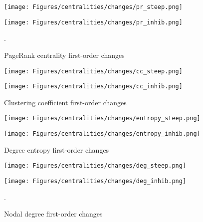 \documentclass[smallextended]{svjour3}       %
\theoremstyle{definition}
\begin{document}
\begin{figure}[]
	\centering
	\hfill
	\begin{minipage}{0.50\textwidth}%
		\texttt{[image: Figures/centralities/changes/pr\_steep.png]}
		\hspace*{2cm}\subcaption{}
	\end{minipage}
	\hfill
	\begin{minipage}{0.40\textwidth}
		\texttt{[image: Figures/centralities/changes/pr\_inhib.png]}
		\hspace*{2cm}\subcaption{}
	\end{minipage}
	\hfill
	\label{fig:pr_change}
	\caption{PageRank centrality first-order changes}. 
\end{figure}


\begin{figure}[]
	\centering
	\hfill
	\begin{minipage}{0.50\textwidth}%
		\texttt{[image: Figures/centralities/changes/cc\_steep.png]}
		\hspace*{2cm}\subcaption{}
	\end{minipage}
	\hfill
	\begin{minipage}{0.40\textwidth}
		\texttt{[image: Figures/centralities/changes/cc\_inhib.png]}
		\hspace*{2cm}\subcaption{}
	\end{minipage}
	\hfill
	\caption{Clustering coefficient first-order changes}
	\label{fig:cc_change}
\end{figure}


\begin{figure}[]
	\centering
	\hfill
	\begin{minipage}{0.50\textwidth}%
		\texttt{[image: Figures/centralities/changes/entropy\_steep.png]}
		\hspace*{2cm}\subcaption{}
	\end{minipage}
	\hfill
	\begin{minipage}{0.40\textwidth}
		\texttt{[image: Figures/centralities/changes/entropy\_inhib.png]}
		\hspace*{2cm}\subcaption{}
	\end{minipage}
	\hfill
	\caption{Degree entropy first-order changes}
	\label{fig:ent_change}
\end{figure}

\begin{figure}[]
	\centering
	\hfill
	\begin{minipage}{0.50\textwidth}%
		\texttt{[image: Figures/centralities/changes/deg\_steep.png]}
		\hspace*{2cm}\subcaption{}
	\end{minipage}
	\hfill
	\begin{minipage}{0.40\textwidth}
		\texttt{[image: Figures/centralities/changes/deg\_inhib.png]}
		\hspace*{2cm}\subcaption{}
	\end{minipage}
	\hfill
	\caption{Nodal degree first-order changes}. 
	\label{fig:deg_change}
\end{figure}
\end{document}
